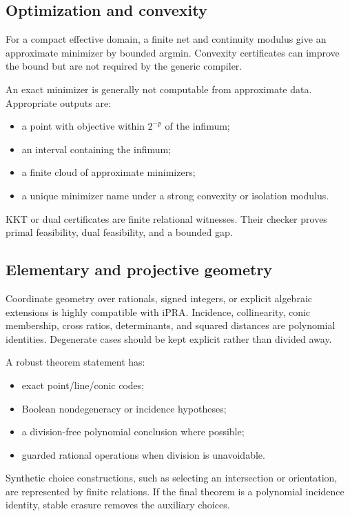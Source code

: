 \subsection{Optimization and convexity}

For a compact effective domain, a finite net and continuity modulus give an approximate minimizer by bounded argmin.  Convexity certificates can improve the bound but are not required by the generic compiler.

An exact minimizer is generally not computable from approximate data.  Appropriate outputs are:

\begin{itemize}
\item a point with objective within \(2^{-p}\) of the infimum;
\item an interval containing the infimum;
\item a finite cloud of approximate minimizers;
\item a unique minimizer name under a strong convexity or isolation modulus.
\end{itemize}

KKT or dual certificates are finite relational witnesses.  Their checker proves primal feasibility, dual feasibility, and a bounded gap.

\subsection{Elementary and projective geometry}

Coordinate geometry over rationals, signed integers, or explicit algebraic extensions is highly compatible with iPRA.  Incidence, collinearity, conic membership, cross ratios, determinants, and squared distances are polynomial identities.  Degenerate cases should be kept explicit rather than divided away.

A robust theorem statement has:

\begin{itemize}
\item exact point/line/conic codes;
\item Boolean nondegeneracy or incidence hypotheses;
\item a division-free polynomial conclusion where possible;
\item guarded rational operations when division is unavoidable.
\end{itemize}

Synthetic choice constructions, such as selecting an intersection or orientation, are represented by finite relations.  If the final theorem is a polynomial incidence identity, stable erasure removes the auxiliary choices.

